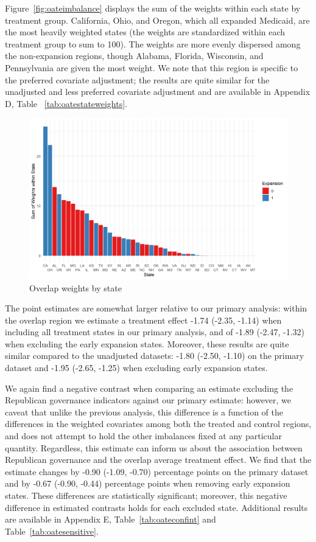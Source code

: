\documentclass[aoas]{imsart}
\theoremstyle{plain}
\theoremstyle{remark}
\begin{document}
Figure~\ref{fig:oateimbalance} displays the sum of the weights within each state by treatment group. California, Ohio, and Oregon, which all expanded Medicaid, are the most heavily weighted states (the weights are standardized within each treatment group to sum to 100). The weights are more evenly dispersed among the non-expansion regions, though Alabama, Florida, Wisconsin, and Pennsylvania are given the most weight. We note that this region is specific to the preferred covariate adjustment; the results are quite similar for the unadjusted and less preferred covariate adjustment and are available in Appendix D, Table ~\ref{tab:oatestateweights}.

\begin{figure}[H]
\begin{center}
    \caption{Overlap weights by state}
    \label{oatearea}
    \includegraphics[scale=0.6]{01_Plots/oate-region-c1-a.png}
\end{center}
\end{figure}

The point estimates are somewhat larger relative to our primary analysis: within the overlap region we estimate a treatment effect -1.74 (-2.35, -1.14) when including all treatment states in our primary analysis, and of -1.89 (-2.47, -1.32) when excluding the early expansion states. Moreover, these results are quite similar compared to the unadjusted datasets: -1.80 (-2.50, -1.10) on the primary dataset and -1.95 (-2.65, -1.25) when excluding early expansion states. 

We again find a negative contrast when comparing an estimate excluding the Republican governance indicators against our primary estimate: however, we caveat that unlike the previous analysis, this difference is a function of the differences in the weighted covariates among both the treated and control regions, and does not attempt to hold the other imbalances fixed at any particular quantity. Regardless, this estimate can inform us about the association between Republican governance and the overlap average treatment effect. We find that the estimate changes by -0.90 (-1.09, -0.70) percentage points on the primary dataset and by -0.67 (-0.90, -0.44) percentage points when removing early expansion states. These differences are statistically significant; moreover, this negative difference in estimated contrasts holds for each excluded state. Additional results are available in Appendix E, Table~\ref{tab:oateconfint} and Table~\ref{tab:oatesensitive}. 
\end{document}
